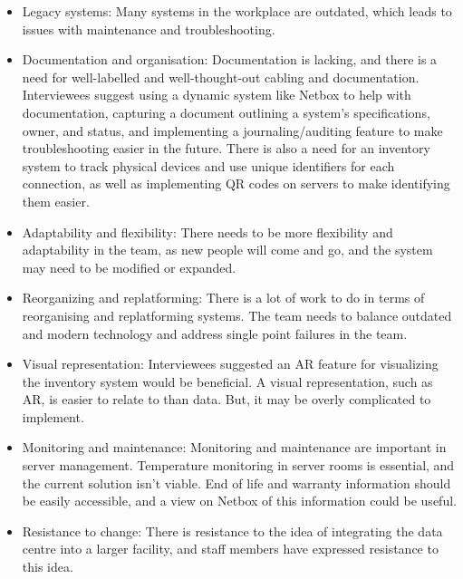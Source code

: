 \documentclass [11pt,a4paper]{article}
\begin{document}
\begin{itemize}
    \item Legacy systems: Many systems in the workplace are outdated, which leads to issues with maintenance and troubleshooting.

    \item Documentation and organisation: Documentation is lacking, and there is a need for well-labelled and well-thought-out cabling and documentation. Interviewees suggest using a dynamic system like Netbox to help with documentation, capturing a document outlining a system's specifications, owner, and status, and implementing a journaling/auditing feature to make troubleshooting easier in the future. There is also a need for an inventory system to track physical devices and use unique identifiers for each connection, as well as implementing QR codes on servers to make identifying them easier.

    \item Adaptability and flexibility: There needs to be more flexibility and adaptability in the team, as new people will come and go, and the system may need to be modified or expanded.

    \item Reorganizing and replatforming: There is a lot of work to do in terms of reorganising and replatforming systems. The team needs to balance outdated and modern technology and address single point failures in the team.

    \item Visual representation: Interviewees suggested an AR feature for visualizing the inventory system would be beneficial. A visual representation, such as AR, is easier to relate to than data. But, it may be overly complicated to implement.

    \item Monitoring and maintenance: Monitoring and maintenance are important in server management. Temperature monitoring in server rooms is essential, and the current solution isn't viable. End of life and warranty information should be easily accessible, and a view on Netbox of this information could be useful.

    \item Resistance to change: There is resistance to the idea of integrating the data centre into a larger facility, and staff members have expressed resistance to this idea.

\end{itemize}
\end{document}
